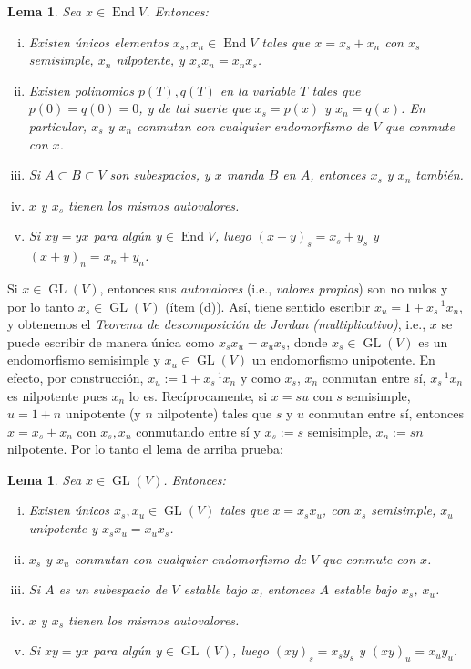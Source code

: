 \documentclass[spanish,12pt]{amsart}
\newtheorem{lemma}[theorem]{Lema}
\theoremstyle{definition}
\theoremstyle{remark}
\numberwithin{equation}{section}
\begin{document}
\begin{lemma}
Sea $x \in \operatorname {End} V$. Entonces:
\begin{enumerate}[(i)]
\item Existen únicos elementos $x_s, x_n \in \operatorname{End} V$ tales que $x = x_s + x_n$ con $x_s$ semisimple, $x_n$ nilpotente, y $x_s x_n = x_n x_s$.
\item Existen polinomios $p(T), q(T)$ en la variable $T$ tales que $p(0) = q(0) = 0$, y de tal suerte que $x_s = p(x)$ y $x_n = q(x)$. En particular, $x_s$ y $x_n$ conmutan con cualquier endomorfismo de $V$ que conmute con $x$.
\item Si $A \subset B \subset V$ son subespacios, y $x$ manda $B$ en $A$, entonces $x_s$ y $x_n$ también.
\item $x$ y $x_s$ tienen los mismos autovalores.
\item Si $xy = yx$ para algún $y \in \operatorname{End} V$, luego $(x+y)_s = x_s + y_s$ y $(x + y)_n = x_n + y_n$.
\end{enumerate}
\end{lemma}

Si $x \in \operatorname{GL} (V)$, entonces sus \textit{autovalores} (i.e., \textit{valores propios}) son no nulos y por lo tanto $x_s \in \operatorname{GL} (V)$ (ítem (d)). Así, tiene sentido escribir $x_u = 1 + x_s^{-1} x_n$, y obtenemos el \textit{Teorema de descomposición de Jordan (multiplicativo)}, i.e., $x$ se puede escribir de manera única como $x_s x_u = x_u x_s$, donde $x_s \in \operatorname{GL} (V)$ es un endomorfismo semisimple y $x_u \in \operatorname{GL}(V)$ un endomorfismo unipotente. En efecto, por construcción, $x_u := 1 + x_s^{-1} x_n$ y como $x_s$, $x_n$ conmutan entre sí, $x_s^{-1} x_n$ es nilpotente pues $x_n$ lo es. Recíprocamente, si $x = s u$ con $s$ semisimple, $u=1 + n$ unipotente (y $n$ nilpotente) tales que $s$ y $u$ conmutan entre sí, entonces $x = x_s + x_n$ con $x_s,x_n$ conmutando entre sí y $x_s := s$ semisimple, $x_n := s n$ nilpotente. Por lo tanto el lema de arriba prueba:

\begin{lemma}
Sea $x \in \operatorname{GL} (V)$. Entonces:
\begin{enumerate}[(i)]
\item Existen únicos $x_s, x_u \in \operatorname{GL} (V)$ tales que $x = x_{s}x_u$, con $x_s$ semisimple, $x_u$ unipotente y $x_s x_u = x_u x_s$.
\item $x_s$ y $x_u$ conmutan con cualquier endomorfismo de $V$ que conmute con $x$.
\item Si $A$ es un subespacio de $V$ estable bajo $x$, entonces $A$ estable bajo $x_s$, $x_u$.
\item $x$ y $x_s$ tienen los mismos autovalores.
\item Si $xy = yx$ para algún $y \in \operatorname{GL} (V)$, luego $(xy)_s = x_s y_s$ y $(xy)_u = x_u y_u$.
\end{enumerate}
\end{lemma}
\end{document}
